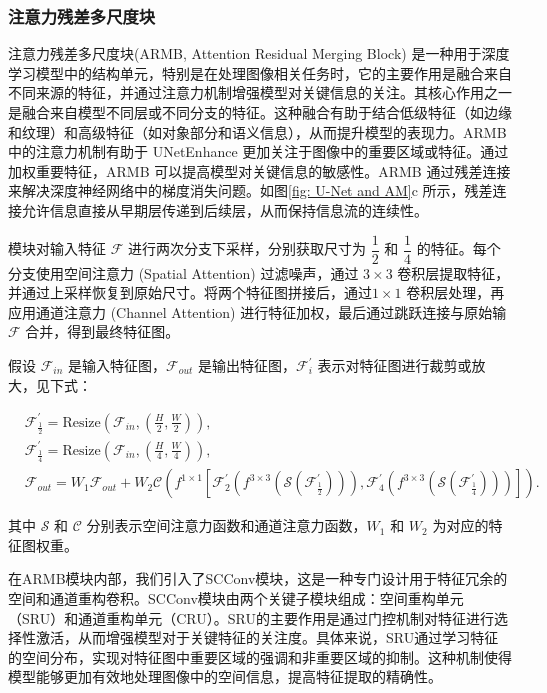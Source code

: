 \documentclass[a4paper]{ctexart}
\begin{document}
\subsubsection{注意力残差多尺度块}

注意力残差多尺度块(ARMB, Attention Residual Merging Block) 是一种用于深度学习模型中的结构单元，特别是在处理图像相关任务时，它的主要作用是融合来自不同来源的特征，并通过注意力机制增强模型对关键信息的关注。其核心作用之一是融合来自模型不同层或不同分支的特征。这种融合有助于结合低级特征（如边缘和纹理）和高级特征（如对象部分和语义信息），从而提升模型的表现力。ARMB 中的注意力机制有助于 UNetEnhance 更加关注于图像中的重要区域或特征。通过加权重要特征，ARMB 可以提高模型对关键信息的敏感性。ARMB 通过残差连接来解决深度神经网络中的梯度消失问题。如图\ref{fig: U-Net and AM}c 所示，残差连接允许信息直接从早期层传递到后续层，从而保持信息流的连续性。

模块对输入特征 $\mathcal{F}$ 进行两次分支下采样，分别获取尺寸为 $\dfrac{1}{2}$ 和 $\dfrac{1}{4}$ 的特征。每个分支使用空间注意力 (Spatial Attention) 过滤噪声，通过 $3 \times 3$ 卷积层提取特征，并通过上采样恢复到原始尺寸。将两个特征图拼接后，通过$ 1 \times 1$ 卷积层处理，再应用通道注意力 (Channel Attention) 进行特征加权，最后通过跳跃连接与原始输 $\mathcal{F}$ 合并，得到最终特征图。

假设 $\mathcal{F}_{in}$ 是输入特征图，$\mathcal{F}_{out}$ 是输出特征图，$\mathcal{F}_{i}^\prime$ 表示对特征图进行裁剪或放大，见下式：

\begin{equation}
	\begin{aligned}
		&\mathcal{F}^\prime_{\frac{1}{2}} = \text{Resize}\left(\mathcal{F}_{in},\left(\frac{H}{2},\frac{W}{2}\right)\right), \\
		&\mathcal{F}^\prime_{\frac{1}{4}} = \text{Resize}\left(\mathcal{F}_{in},\left(\frac{H}{4},\frac{W}{4}\right)\right), \\
		&\mathcal{F}_{out} = W_1\mathcal{F}_{out} + W_2\mathcal{C} \left( f^{1 \times 1}  \left[\mathcal{F}^\prime_2 (f^{3 \times 3}(\mathcal{S}(\mathcal{F}^\prime_{\frac{1}{2}}))), \mathcal{F}^\prime_4 (f^{3 \times 3}(\mathcal{S}(\mathcal{F}^\prime_{\frac{1}{4}})))\right] \right).
	\end{aligned}
	\label{eq: ARMB}
\end{equation}

其中 $\mathcal{S}$ 和 $\mathcal{C}$ 分别表示空间注意力函数和通道注意力函数，$W_1$ 和 $W_2$ 为对应的特征图权重。

在ARMB模块内部，我们引入了SCConv模块，这是一种专门设计用于特征冗余的空间和通道重构卷积。SCConv模块由两个关键子模块组成：空间重构单元（SRU）和通道重构单元（CRU）。SRU的主要作用是通过门控机制对特征进行选择性激活，从而增强模型对于关键特征的关注度。具体来说，SRU通过学习特征的空间分布，实现对特征图中重要区域的强调和非重要区域的抑制。这种机制使得模型能够更加有效地处理图像中的空间信息，提高特征提取的精确性。
\end{document}
